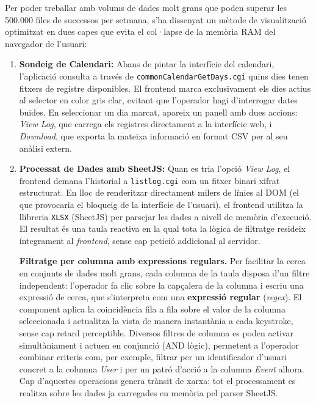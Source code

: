 Per poder treballar amb volums de dades molt grans que poden superar les 500.000 files de successos per setmana, s'ha dissenyat un mètode de visualització optimitzat en dues capes que evita el col·lapse de la memòria RAM del navegador de l'usuari:
\begin{enumerate}
  \item \textbf{Sondeig de Calendari:} Abans de pintar la interfície del calendari, l'aplicació consulta a través de \texttt{commonCalendarGetDays.cgi} quins dies tenen fitxers de registre disponibles. El frontend marca exclusivament els dies actius al selector en color gris clar, evitant que l'operador hagi d'interrogar dates buides. En seleccionar un dia marcat, apareix un panell amb dues accions: \textit{View Log}, que carrega els registres directament a la interfície web, i \textit{Download}, que exporta la mateixa informació en format CSV per al seu anàlisi extern.
  \item \textbf{Processat de Dades amb SheetJS:} Quan es tria l'opció \textit{View Log}, el frontend demana l'historial a \texttt{listlog.cgi} com un fitxer binari xifrat estructurat. En lloc de renderitzar directament milers de línies al DOM (el que provocaria el bloqueig de la interfície de l'usuari), el frontend utilitza la llibreria \texttt{XLSX} (SheetJS) per parsejar les dades a nivell de memòria d'execució. El resultat és una taula reactiva en la qual tota la lògica de filtratge resideix íntegrament al \textit{frontend}, sense cap petició addicional al servidor.

\textbf{Filtratge per columna amb expressions regulars.} Per facilitar la cerca en conjunts de dades molt grans, cada columna de la taula disposa d'un filtre independent: l'operador fa clic sobre la capçalera de la columna i escriu una expressió de cerca, que s'interpreta com una \textbf{expressió regular} (\textit{regex}). El component aplica la coincidència fila a fila sobre el valor de la columna seleccionada i actualitza la vista de manera instantània a cada keystroke, sense cap retard perceptible. Diversos filtres de columna es poden activar simultàniament i actuen en conjunció (AND lògic), permetent a l'operador combinar criteris com, per exemple, filtrar per un identificador d'usuari concret a la columna \textit{User} i per un patró d'acció a la columna \textit{Event} alhora. Cap d'aquestes operacions genera trànsit de xarxa: tot el processament es realitza sobre les dades ja carregades en memòria pel parser SheetJS.
\end{enumerate}

